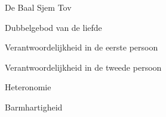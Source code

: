 \documentclass[main.tex]{subfiles}
\begin{document}
\begin{examenvraag}
    \begin{vraag}
        De Baal Sjem Tov
    \end{vraag}

    \begin{antwoord}

    \end{antwoord}
\end{examenvraag}


\begin{examenvraag}
    \begin{vraag}
        Dubbelgebod van de liefde
    \end{vraag}

    \begin{antwoord}

    \end{antwoord}
\end{examenvraag}


\begin{examenvraag}
    \begin{vraag}
        Verantwoordelijkheid in de eerste persoon
    \end{vraag}

    \begin{antwoord}

    \end{antwoord}
\end{examenvraag}


\begin{examenvraag}
    \begin{vraag}
        Verantwoordelijkheid in de tweede persoon
    \end{vraag}

    \begin{antwoord}

    \end{antwoord}
\end{examenvraag}


\begin{examenvraag}
    \begin{vraag}
        Heteronomie
    \end{vraag}

    \begin{antwoord}

    \end{antwoord}
\end{examenvraag}


\begin{examenvraag}
    \begin{vraag}
        Barmhartigheid
    \end{vraag}

    \begin{antwoord}

    \end{antwoord}
\end{examenvraag}
\end{document}
